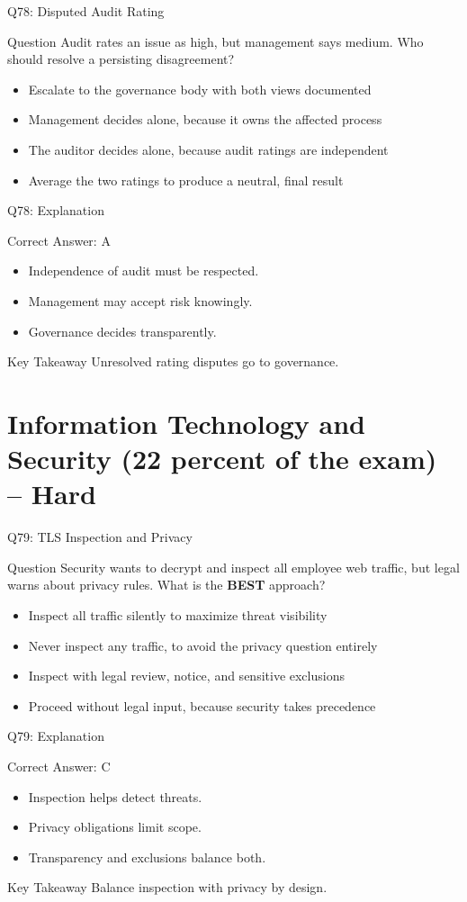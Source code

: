 \documentclass[aspectratio=169]{beamer}
\newcommand{\hq}[7]{%
	\begin{frame}{Q#1: #2}
		\begin{block}{Question}
			#3
		\end{block}
		\begin{itemize}
			#4
		\end{itemize}
	\end{frame}
	\begin{frame}{Q#1: Explanation}
		\begin{block}{Correct Answer: #5}
			\begin{itemize}
				#6
			\end{itemize}
		\end{block}
		\begin{alertblock}{Key Takeaway}
			#7
		\end{alertblock}
	\end{frame}
}
\begin{document}
	\hq{78}{Disputed Audit Rating}
	{Audit rates an issue as high, but management says medium. Who should resolve a persisting disagreement?}
	{\item[\textbf{(A)}] Escalate to the governance body with both views documented
		\item[\textbf{(B)}] Management decides alone, because it owns the affected process
		\item[\textbf{(C)}] The auditor decides alone, because audit ratings are independent
		\item[\textbf{(D)}] Average the two ratings to produce a neutral, final result}
	{A}
	{\item Independence of audit must be respected.
		\item Management may accept risk knowingly.
		\item Governance decides transparently.}
	{Unresolved rating disputes go to governance.}

	\section{Information Technology and Security (22 percent of the exam) -- Hard}

	\hq{79}{TLS Inspection and Privacy}
	{Security wants to decrypt and inspect all employee web traffic, but legal warns about privacy rules. What is the \textbf{BEST} approach?}
	{\item[\textbf{(A)}] Inspect all traffic silently to maximize threat visibility
		\item[\textbf{(B)}] Never inspect any traffic, to avoid the privacy question entirely
		\item[\textbf{(C)}] Inspect with legal review, notice, and sensitive exclusions
		\item[\textbf{(D)}] Proceed without legal input, because security takes precedence}
	{C}
	{\item Inspection helps detect threats.
		\item Privacy obligations limit scope.
		\item Transparency and exclusions balance both.}
	{Balance inspection with privacy by design.}
\end{document}
